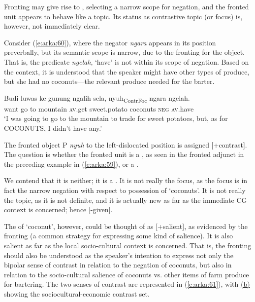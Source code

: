 \documentclass[output=paper
,modfonts
,nonflat]{langsci/langscibook}
\begin{document}
\noindent
Fronting may give rise to , selecting a narrow scope for negation, and the fronted unit appears to behave like a topic. Its status as contrastive topic (or focus) is, however, not immediately clear. 

Consider (\ref{e:arka:60}), where the negator \textit{ngara} appears in its position preverbally, but its semantic scope is narrow, due to the fronting for the object. That is, the predicate \textit{ngelah}, ‘have’ is not within its scope of negation. Based on the context, it is understood that the speaker might have other types of produce, but she had no coconuts—the relevant produce needed for the barter.

\begin{exe}
	\ex\label{e:arka:60}
	\gll Budi   luwas   ke   gunung   ngalih   sela, {\ob}nyuh{\cb}\textsubscript{ContrFoc}  ngara   ngelah.\\
	want   go  to  mountain  \textsc{av}.get  sweet.potato \phantom{[}coconuts  \textsc{neg}  \textsc{av}.have\\
	\glt ‘I was going to go to the mountain to trade for sweet potatoes, but, as for COCONUTS, I didn’t have any.’
\end{exe}

\noindent
The fronted object P \textit{nyuh} to the left-dislocated position is assigned [+contrast]. The question is whether the fronted unit is a , as seen in the fronted adjunct in the preceding example in (\ref{e:arka:59}), or a . 

We contend that it is neither; it is a . It is not really the focus, as the focus is in fact the narrow negation with respect to possession of ‘coconuts’.  It is not really the topic, as it is not definite, and it is actually new as far as the immediate CG context is concerned; hence [-given]. 

The  of ‘coconut’, however, could be thought of as [+salient], as evidenced by the fronting (a common strategy for expressing some kind of salience). It is also salient as far as the local socio-cultural context is concerned. That is, the fronting should also be understood as the speaker’s intention to express not only the bipolar sense of contrast in relation to the negation of coconuts, but also in relation to the socio-cultural salience of coconuts vs. other items of farm produce for bartering. The two senses of contrast are represented in (\ref{e:arka:61}), with \hyperref[e:arka:61b]{(b)} showing the sociocultural-economic contrast set.
\end{document}
